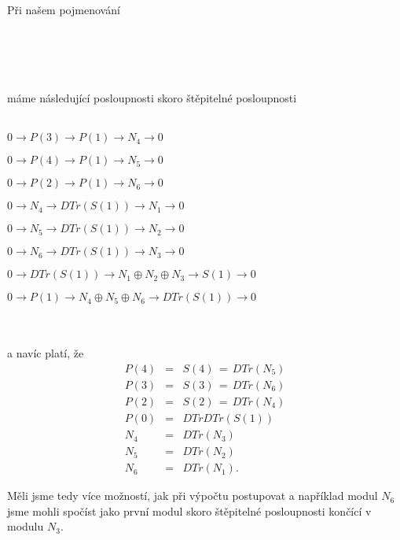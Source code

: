          Při našem pojmenování \\\\
         \centerline{
         }\\\\\\
          máme následující posloupnosti skoro štěpitelné posloupnosti \\\\
          \centerline{$   0\to P(3)\to P(1)\to N_4\to 0     $}
          \centerline{$   0\to P(4)\to P(1)\to N_5\to 0     $}
          \centerline{$   0\to P(2)\to P(1)\to N_6\to 0     $}
          \centerline{$   0\to N_4\to DTr(S(1))\to N_1\to 0     $}
          \centerline{$   0\to N_5\to DTr(S(1))\to N_2\to 0     $}
          \centerline{$   0\to N_6\to DTr(S(1))\to N_3\to 0     $}
          \centerline{$   0\to DTr(S(1))\to N_1\oplus N_2 \oplus N_3\to S(1)\to 0     $}
          \centerline{$   0\to P(1)\to N_4\oplus N_5\oplus N_6\to DTr(S(1)) \to 0     $}
          \\\\
          a navíc platí, že
          \begin{eqnarray}
            P(4) &=& S(4) \, = \, DTr(N_5)\nonumber \\
            P(3) &=& S(3) \, = \, DTr(N_6) \nonumber \\
            P(2) &=& S(2) \, = \, DTr(N_4) \nonumber \\
            P(0) &=& DTrDTr(S(1)) \nonumber \\
            N_4 &=& DTr(N_3) \nonumber \\
            N_5 &=& DTr(N_2) \nonumber \\
            N_6 &=& DTr(N_1). \nonumber
          \end{eqnarray}
          
          Měli jsme tedy více možností, jak při výpočtu postupovat a například 
          modul $N_6$ jsme mohli spočíst jako první modul skoro štěpitelné 
          posloupnosti končící v modulu $N_3$.
          
